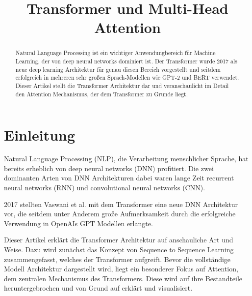 \documentclass[conference]{IEEEtran}
\begin{document}
\title{Transformer und Multi-Head Attention}


\author{
}

\maketitle


\begin{abstract}
Natural Language Processing ist ein wichtiger Anwendungbereich für Machine Learning, der von deep neural networks dominiert ist. Der Transformer wurde 2017 als neue deep learning Architektur für genau diesen Bereich vorgestellt und seitdem erfolgreich in mehreren sehr großen Sprach-Modellen wie GPT-2 und BERT verwendet. Dieser Artikel stellt die Transformer Architektur dar und veranschaulicht im Detail den Attention Mechanismus, der dem Transformer zu Grunde liegt.
\end{abstract}


\section{Einleitung}
Natural Language Processing (NLP), die Verarbeitung menschlicher Sprache, hat bereits erheblich von deep neural networks (DNN) profitiert. Die zwei dominanten Arten von DNN Architekturen dabei waren lange Zeit recurrent neural networks (RNN) und convolutional neural networks (CNN). \cite{comparative_study_cnn_rnn}

2017 stellten Vaswani et al. \cite{attention_is_all_you_need} mit dem Transformer eine neue DNN Architektur vor, die seitdem unter Anderem große Aufmerksamkeit durch die erfolgreiche Verwendung in OpenAIs GPT Modellen \cite{gpt_1} erlangte.

Dieser Artikel erklärt die Transformer Architektur auf anschauliche Art und Weise. Dazu wird zunächst das Konzept von Sequence to Sequence Learning zusammengefasst, welches der Transformer aufgreift. Bevor die vollständige Modell Architektur dargestellt wird, liegt ein besonderer Fokus auf Attention, dem zentralen Mechanismus des Transformers. Diese wird auf ihre Bestandteile heruntergebrochen und von Grund auf erklärt und visualisiert.
\end{document}
